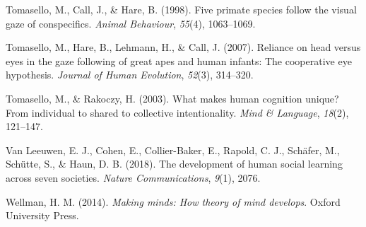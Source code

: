 \documentclass[
  man,floatsintext]{apa7}
\newlength{\cslhangindent}
\newenvironment{CSLReferences}[2] %
 {\begin{list}{}{%
  \setlength{\itemindent}{0pt}
  \setlength{\leftmargin}{0pt}
  \setlength{\parsep}{0pt}
  \ifodd #1
   \setlength{\leftmargin}{\cslhangindent}
   \setlength{\itemindent}{-1\cslhangindent}
  \fi
  \setlength{\itemsep}{#2\baselineskip}}}
 {\end{list}}
\begin{document}
\begin{CSLReferences}{1}{0}
Tomasello, M., Call, J., \& Hare, B. (1998). Five primate species follow the visual gaze of conspecifics. \emph{Animal Behaviour}, \emph{55}(4), 1063--1069.

Tomasello, M., Hare, B., Lehmann, H., \& Call, J. (2007). Reliance on head versus eyes in the gaze following of great apes and human infants: The cooperative eye hypothesis. \emph{Journal of Human Evolution}, \emph{52}(3), 314--320.

Tomasello, M., \& Rakoczy, H. (2003). What makes human cognition unique? From individual to shared to collective intentionality. \emph{Mind \& Language}, \emph{18}(2), 121--147.

Van Leeuwen, E. J., Cohen, E., Collier-Baker, E., Rapold, C. J., Schäfer, M., Schütte, S., \& Haun, D. B. (2018). The development of human social learning across seven societies. \emph{Nature Communications}, \emph{9}(1), 2076.

Wellman, H. M. (2014). \emph{Making minds: How theory of mind develops}. Oxford University Press.

\end{CSLReferences}
\end{document}
